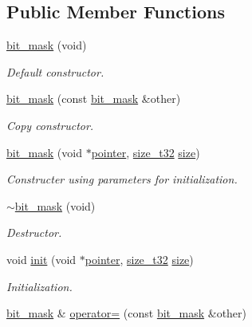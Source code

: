 \subsection*{Public Member Functions}
\begin{DoxyCompactItemize}
\item 
\hyperlink{classcrap_1_1bit__mask_a8c61d3022cd0fc1add03ae5d77a428f7}{bit\-\_\-mask} (void)
\begin{DoxyCompactList}\small\item\em Default constructor. \end{DoxyCompactList}\item 
\hyperlink{classcrap_1_1bit__mask_ab42b7bd94645e5df2ca5cee4cd988672}{bit\-\_\-mask} (const \hyperlink{classcrap_1_1bit__mask}{bit\-\_\-mask} \&other)
\begin{DoxyCompactList}\small\item\em Copy constructor. \end{DoxyCompactList}\item 
\hyperlink{classcrap_1_1bit__mask_a2d55cd18751b5b92a7873076feccfb33}{bit\-\_\-mask} (void $\ast$\hyperlink{classcrap_1_1bit__mask_a18d0d45733d73f81f8366e23ca094db4}{pointer}, \hyperlink{types_8h_a38c0a12279ffe0fabec44939e753c914}{size\-\_\-t32} \hyperlink{classcrap_1_1bit__mask_a8bdd624a4eec41c6de938397f67986bd}{size})
\begin{DoxyCompactList}\small\item\em Constructer using parameters for initialization. \end{DoxyCompactList}\item 
\hyperlink{classcrap_1_1bit__mask_ac96ea84ab936e421510763c79f98d7bb}{$\sim$bit\-\_\-mask} (void)
\begin{DoxyCompactList}\small\item\em Destructor. \end{DoxyCompactList}\item 
void \hyperlink{classcrap_1_1bit__mask_adfb7e56b1c5f47ff651c765bee305299}{init} (void $\ast$\hyperlink{classcrap_1_1bit__mask_a18d0d45733d73f81f8366e23ca094db4}{pointer}, \hyperlink{types_8h_a38c0a12279ffe0fabec44939e753c914}{size\-\_\-t32} \hyperlink{classcrap_1_1bit__mask_a8bdd624a4eec41c6de938397f67986bd}{size})
\begin{DoxyCompactList}\small\item\em Initialization. \end{DoxyCompactList}\item 
\hyperlink{classcrap_1_1bit__mask}{bit\-\_\-mask} \& \hyperlink{classcrap_1_1bit__mask_a3cb8adeeedab783e54e8da45633fb0af}{operator=} (const \hyperlink{classcrap_1_1bit__mask}{bit\-\_\-mask} \&other)

\end{DoxyCompactItemize}
